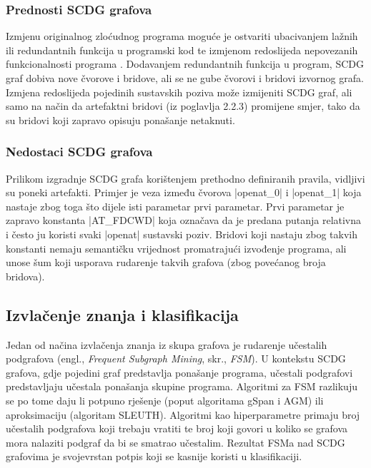 \subsubsection{Prednosti SCDG grafova}

Izmjenu originalnog zloćudnog programa moguće je ostvariti ubacivanjem lažnih
ili redundantnih funkcija u programski kod te izmjenom redoslijeda nepovezanih
funkcionalnosti programa \cite{mirai_main}. Dodavanjem redundantnih funkcija u
program, SCDG graf dobiva nove čvorove i bridove, ali se ne gube čvorovi i
bridovi izvornog grafa. Izmjena redoslijeda pojedinih sustavskih poziva može
izmijeniti SCDG graf, ali samo na način da artefaktni bridovi (iz poglavlja
2.2.3) promijene smjer, tako da su bridovi koji zapravo opisuju ponašanje
netaknuti.

\subsubsection{Nedostaci SCDG grafova}


Prilikom izgradnje SCDG grafa korištenjem prethodno definiranih pravila,
vidljivi su poneki artefakti. Primjer je veza između čvorova
\inlinecode|openat_0| i \inlinecode|openat_1| koja nastaje zbog toga što dijele
isti parametar prvi parametar. Prvi parametar je zapravo konstanta 
\inlinecode|AT_FDCWD| koja označava da je predana putanja relativna i često ju
koristi svaki \inlinecode|openat| sustavski poziv. Bridovi koji nastaju zbog
takvih konstanti nemaju semantičku vrijednost promatrajući izvođenje programa,
ali unose šum koji usporava rudarenje takvih grafova (zbog povećanog broja bridova).



\subsection{Izvlačenje znanja i klasifikacija}

Jedan od načina izvlačenja znanja iz skupa grafova je rudarenje učestalih
podgrafova (engl., \textit{Frequent Subgraph Mining}, skr., \textit{FSM}).
U kontekstu SCDG grafova, gdje pojedini graf predstavlja ponašanje programa,
učestali podgrafovi predstavljaju učestala ponašanja skupine programa. Algoritmi
za FSM razlikuju se po tome daju li potpuno rješenje (poput algoritama gSpan i 
AGM) ili aproksimaciju (algoritam SLEUTH). Algoritmi kao hiperparametre primaju
broj učestalih podgrafova koji trebaju vratiti te broj koji govori u koliko se
grafova mora nalaziti podgraf da bi se smatrao učestalim. Rezultat FSMa nad SCDG
grafovima je svojevrstan potpis koji se kasnije koristi u klasifikaciji.

